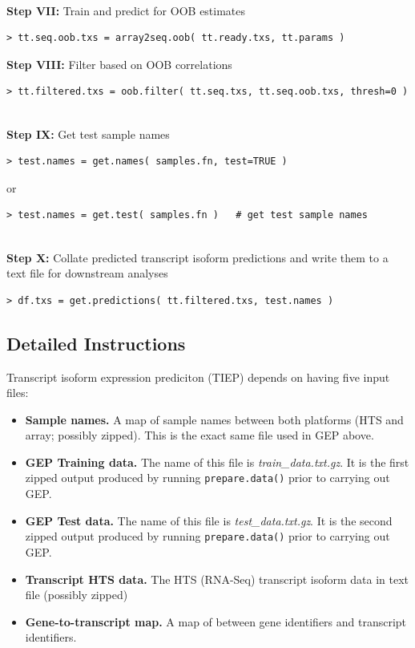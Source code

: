 \documentclass[a4paper,12pt]{article}
\begin{document}
\noindent\\
\textbf{Step VII:} Train and predict for OOB estimates
\begin{verbatim}
> tt.seq.oob.txs = array2seq.oob( tt.ready.txs, tt.params )
\end{verbatim}
\textbf{Step VIII:} Filter based on OOB correlations
\begin{verbatim}
> tt.filtered.txs = oob.filter( tt.seq.txs, tt.seq.oob.txs, thresh=0 )
\end{verbatim}

\noindent\\
\textbf{Step IX:} Get test sample names
\begin{verbatim}
> test.names = get.names( samples.fn, test=TRUE )
\end{verbatim}
or 
\begin{verbatim}
> test.names = get.test( samples.fn )   # get test sample names
\end{verbatim}

\noindent\\
\textbf{Step X:} Collate predicted transcript isoform predictions and write them to a text file for downstream analyses
\begin{verbatim}
> df.txs = get.predictions( tt.filtered.txs, test.names )
\end{verbatim}

\subsection{Detailed Instructions}
\label{tiep:detailed}
Transcript isoform expression prediciton (TIEP) depends on having five input files:
\begin{itemize}
\item \textbf{Sample names.} A map of sample names between both platforms (HTS and array; possibly zipped). This is the exact same file used in GEP above.
\item \textbf{GEP Training data.} The name of this file is \textit{train\_data.txt.gz}. It is the first zipped output produced by running \texttt{prepare.data()} prior to carrying out GEP.
\item \textbf{GEP Test data.} The name of this file is \textit{test\_data.txt.gz}. It is the second zipped output produced by running \texttt{prepare.data()} prior to carrying out GEP.
\item \textbf{Transcript HTS data.} The HTS (RNA-Seq) transcript isoform data in text file (possibly zipped)
\item \textbf{Gene-to-transcript map.} A map of between gene identifiers and transcript identifiers. 
\end{itemize}
\end{document}
